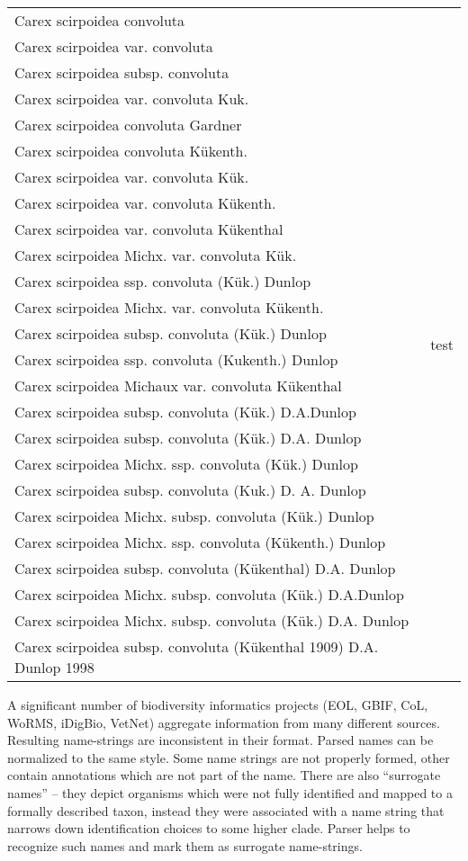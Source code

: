 \documentclass{bmcart}
\begin{document}
\begin{tabular}{| l | c |}
\hline
Carex scirpoidea convoluta &
\multirow{25}{*}{test} \\
Carex scirpoidea var. convoluta & \\
Carex scirpoidea subsp. convoluta & \\
Carex scirpoidea var. convoluta Kuk. & \\
Carex scirpoidea convoluta Gardner & \\
Carex scirpoidea convoluta Kükenth. & \\
Carex scirpoidea var. convoluta Kük. & \\
Carex scirpoidea var. convoluta Kükenth. & \\
Carex scirpoidea var. convoluta Kükenthal & \\
Carex scirpoidea Michx. var. convoluta Kük. & \\
Carex scirpoidea ssp. convoluta (Kük.) Dunlop & \\
Carex scirpoidea Michx. var. convoluta Kükenth. & \\
Carex scirpoidea subsp. convoluta (Kük.) Dunlop & \\
Carex scirpoidea ssp. convoluta (Kukenth.) Dunlop & \\
Carex scirpoidea Michaux var. convoluta Kükenthal & \\
Carex scirpoidea subsp. convoluta (Kük.) D.A.Dunlop & \\
Carex scirpoidea subsp. convoluta (Kük.) D.A. Dunlop & \\
Carex scirpoidea Michx. ssp. convoluta (Kük.) Dunlop & \\
Carex scirpoidea subsp. convoluta (Kuk.) D. A. Dunlop & \\
Carex scirpoidea Michx. subsp. convoluta (Kük.) Dunlop & \\
Carex scirpoidea Michx. ssp. convoluta (Kükenth.) Dunlop & \\
Carex scirpoidea subsp. convoluta (Kükenthal) D.A. Dunlop & \\
Carex scirpoidea Michx. subsp. convoluta (Kük.) D.A.Dunlop & \\
Carex scirpoidea Michx. subsp. convoluta (Kük.) D.A. Dunlop & \\
Carex scirpoidea subsp. convoluta (Kükenthal 1909) D.A. Dunlop 1998 & 
test
\\
\hline
\end{tabular}


A significant number of biodiversity informatics projects (EOL, GBIF, CoL,
WoRMS, iDigBio, VetNet) aggregate information from many different sources.
Resulting name-strings are inconsistent in their format. Parsed names can be
normalized to the same style. Some name strings are not properly formed, other
contain annotations which are not part of the name. There are also “surrogate
names” -- they depict organisms which were not fully identified and mapped to a
formally described taxon, instead they were associated with a name string that
narrows down identification choices to some higher clade. Parser helps to
recognize such names and mark them as surrogate name-strings.
\end{document}
